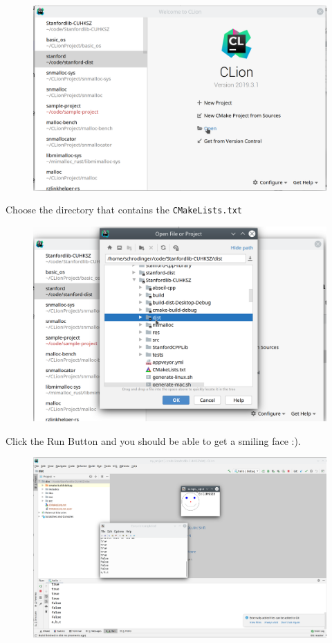\documentclass[a4paper,12pt]{report}
\begin{document}
\begin{figure}[H] 
	\centering
	\includegraphics[width=\linewidth]{clion1}
\end{figure}

Choose the directory that contains the \texttt{CMakeLists.txt}

\begin{figure}[H] 
	\centering
	\includegraphics[scale=0.56]{clion2}
\end{figure}

Click the Run Button and you should be able to get a smiling face :).

\begin{figure}[H] 
	\centering
	\includegraphics[scale=0.4]{clion3}
\end{figure}
\end{document}
